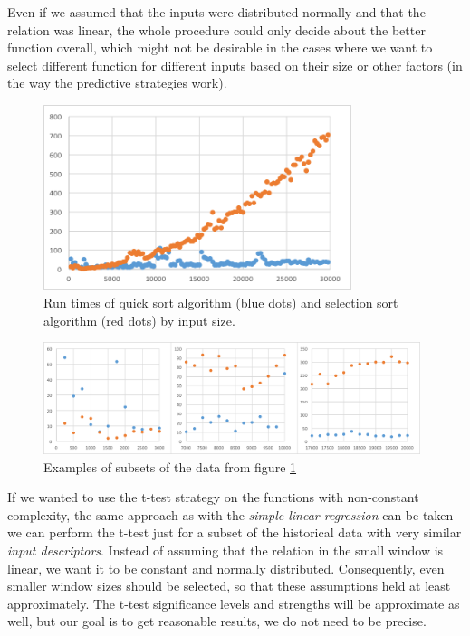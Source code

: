 Even if we assumed that the inputs were distributed normally and that the relation was linear, the whole procedure could only decide about the better function overall, which might not be desirable in the cases where we want to select different function for different inputs based on their size or other factors (in the way the predictive strategies work).

\begin{figure}[h!]
	\captionsetup{justification=centering,margin=0.5cm}
	\centerline{\mbox{\includegraphics[width=90mm]{./img/quick_vs_selection.png}}}
	\caption{Run times of quick sort algorithm (blue dots) and selection sort algorithm (red dots) by input size.}
	\label{fig:quick_vs_selection}
\end{figure}

\begin{figure}[h!]
	\captionsetup{justification=centering,margin=0.5cm}
	\centerline{\mbox{\includegraphics[width=110mm]{./img/window_t_test_examples.png}}}
	\caption{Examples of subsets of the data from figure \ref{fig:quick_vs_selection}}
	\label{fig:window_t_test_examples}
\end{figure}

If we wanted to use the t-test strategy on the functions with non-constant complexity, the same approach as with the \textit{simple linear regression} can be taken - we can perform the t-test just for a subset of the historical data with very similar \textit{input descriptors}. Instead of assuming that the relation in the small window is linear, we want it to be constant and normally distributed. Consequently, even smaller window sizes should be selected, so that these assumptions held at least approximately. The t-test significance levels and strengths will be approximate as well, but our goal is to get reasonable results, we do not need to be precise.

